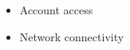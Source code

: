 \begin{objectives}
\prerequisites
\begin{itemize}
\item Account access
\item Network connectivity
\end{itemize}
\end{objectives}
